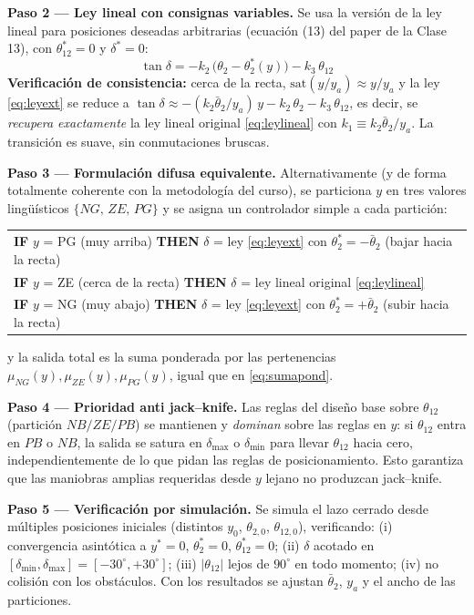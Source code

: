 \documentclass[11pt,a4paper]{article}
\newcommand{\grados}{^{\circ}}
\begin{document}
\textbf{Paso 2 — Ley lineal con consignas variables.} Se usa la versión de la ley lineal para posiciones deseadas arbitrarias (ecuación (13) del paper de la Clase 13), con $\theta_{12}^{*}=0$ y $\delta^{*}=0$:
\begin{equation}
\tan\delta = -k_2\,\bigl(\theta_2-\theta_2^{*}(y)\bigr) - k_3\,\theta_{12}
\label{eq:leyext}
\end{equation}
\textbf{Verificación de consistencia:} cerca de la recta, $\mathrm{sat}(y/y_a)\approx y/y_a$ y la ley \eqref{eq:leyext} se reduce a
$\tan\delta \approx -(k_2\bar\theta_2/y_a)\,y - k_2\,\theta_2 - k_3\,\theta_{12}$,
es decir, se \emph{recupera exactamente} la ley lineal original \eqref{eq:leylineal} con $k_1\equiv k_2\bar\theta_2/y_a$. La transición es suave, sin conmutaciones bruscas.

\textbf{Paso 3 — Formulación difusa equivalente.} Alternativamente (y de forma totalmente coherente con la metodología del curso), se particiona $y$ en tres valores lingüísticos $\{NG,\,ZE,\,PG\}$ y se asigna un controlador simple a cada partición:
\begin{center}
\begin{tabular}{l}
\textbf{IF } $y$ = PG (muy arriba) \textbf{ THEN } $\delta$ = ley \eqref{eq:leyext} con $\theta_2^{*}=-\bar\theta_2$ (bajar hacia la recta)\\
\textbf{IF } $y$ = ZE (cerca de la recta) \textbf{ THEN } $\delta$ = ley lineal original \eqref{eq:leylineal}\\
\textbf{IF } $y$ = NG (muy abajo) \textbf{ THEN } $\delta$ = ley \eqref{eq:leyext} con $\theta_2^{*}=+\bar\theta_2$ (subir hacia la recta)
\end{tabular}
\end{center}
y la salida total es la suma ponderada por las pertenencias $\mu_{NG}(y),\mu_{ZE}(y),\mu_{PG}(y)$, igual que en \eqref{eq:sumapond}.

\textbf{Paso 4 — Prioridad anti jack--knife.} Las reglas del diseño base sobre $\theta_{12}$ (partición $NB/ZE/PB$) se mantienen y \emph{dominan} sobre las reglas en $y$: si $\theta_{12}$ entra en $PB$ o $NB$, la salida se satura en $\delta_{\max}$ o $\delta_{\min}$ para llevar $\theta_{12}$ hacia cero, independientemente de lo que pidan las reglas de posicionamiento. Esto garantiza que las maniobras amplias requeridas desde $y$ lejano no produzcan jack--knife.

\textbf{Paso 5 — Verificación por simulación.} Se simula el lazo cerrado desde múltiples posiciones iniciales (distintos $y_0$, $\theta_{2,0}$, $\theta_{12,0}$), verificando: (i) convergencia asintótica a $y^{*}=0$, $\theta_2^{*}=0$, $\theta_{12}^{*}=0$; (ii) $\delta$ acotado en $[\delta_{\min},\delta_{\max}]=[-30\grados,+30\grados]$; (iii) $|\theta_{12}|$ lejos de $90\grados$ en todo momento; (iv) no colisión con los obstáculos. Con los resultados se ajustan $\bar\theta_2$, $y_a$ y el ancho de las particiones.
\end{document}
